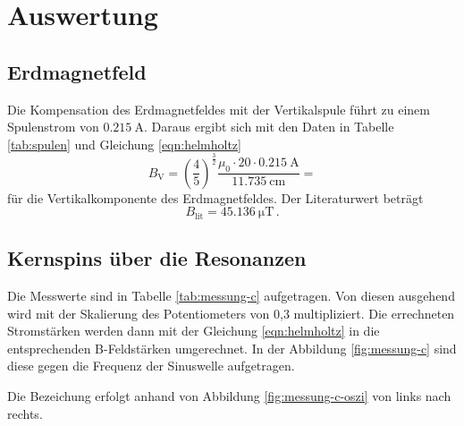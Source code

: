 \section{Auswertung}
\label{sec:Auswertung}

\subsection{Erdmagnetfeld}
Die Kompensation des Erdmagnetfeldes mit der Vertikalspule führt zu
einem Spulenstrom von $\SI{0.215}{\ampere}$.
Daraus ergibt sich mit den Daten in Tabelle \ref{tab:spulen}
und Gleichung \eqref{eqn:helmholtz}
\begin{equation}
  B_\text{V} = \left(\frac{4}{5}\right)^{\!\!\frac{3}{2}}
    \frac{μ_0 \cdot 20 \cdot \SI{0.215}{\ampere}}{\SI{11.735}{\centi\meter}}
  = 
\end{equation}
für die Vertikalkomponente des Erdmagnetfeldes.
Der Literaturwert \cite{erdmagnetfeld} beträgt
\begin{equation}
  B_\text{lit} = \SI{45.136}{\micro\tesla}\,.
\end{equation}

\subsection{Kernspins über die Resonanzen}
\label{sec:5.2}
Die Messwerte sind in Tabelle \ref{tab:messung-c} aufgetragen.
Von diesen ausgehend wird mit der Skalierung des Potentiometers von 0,3 multipliziert.
Die errechneten Stromstärken werden dann mit der Gleichung \eqref{eqn:helmholtz}
in die entsprechenden B-Feldstärken umgerechnet.
In der Abbildung \ref{fig:messung-c} sind diese gegen die Frequenz der Sinuswelle aufgetragen.

Die Bezeichung erfolgt anhand von Abbildung \ref{fig:messung-c-oszi} von links nach rechts.

